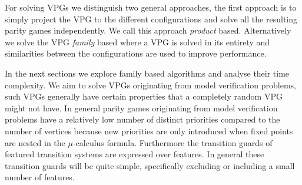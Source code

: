 For solving VPGs we distinguish two general approaches, the first approach is to simply project the VPG to the different configurations and solve all the resulting parity games independently. We call this approach \textit{product} based. Alternatively we solve the VPG \textit{family} based where a VPG is solved in its entirety and similarities between the configurations are used to improve performance. 

In the next sections we explore family based algorithms and analyse their time complexity. We aim to solve VPGs originating from model verification problems, such VPGs generally have certain properties that a completely random VPG might not have. In general parity games originating from model verification problems have a relatively low number of distinct priorities compared to the number of vertices because new priorities are only introduced when fixed points are nested in the $\mu$-calculus formula. Furthermore the transition guards of featured transition systems are expressed over features. In general these transition guards will be quite simple, specifically excluding or including a small number of features.
